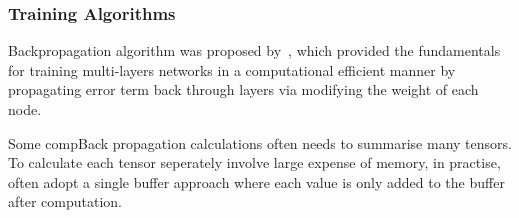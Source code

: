 \subsubsection{Training Algorithms}
Backpropagation algorithm was proposed by~\citet{werbos1975beyond}, which provided the fundamentals for training multi-layers networks in a computational efficient manner by propagating error term back through layers via modifying the weight of each node. 
\par
Some compBack propagation calculations often needs to summarise many tensors. To calculate each tensor seperately involve large expense of memory, in practise, often adopt a single buffer approach where each value is only added to the buffer after computation. 
